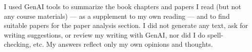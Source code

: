 \documentclass[11pt]{article}
\begin{document}
I used GenAI tools to summarize the book chapters and papers I read (but not any course materials) --- as a supplement to my own reading --- and to find suitable papers for the paper analysis section. I did not generate any text, ask for writing suggestions, or review my writing with GenAI, nor did I do spell-checking, etc. My answers reflect only my own opinions and thoughts.
\end{document}
